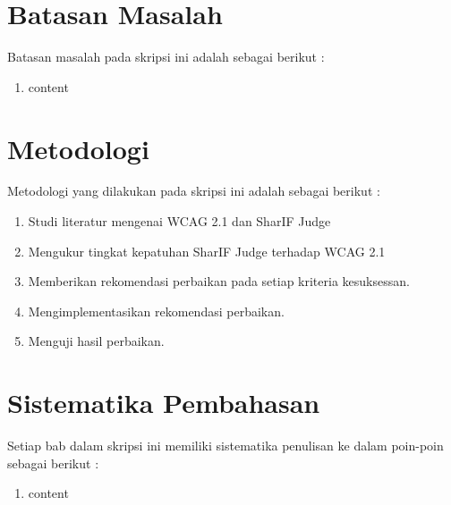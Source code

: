 \section{Batasan Masalah}
\label{sec:batasan}
Batasan masalah pada skripsi ini adalah sebagai berikut :

\begin{enumerate}
	\item content
\end{enumerate}

\section{Metodologi}
\label{sec:metlit}
Metodologi yang dilakukan pada skripsi ini adalah sebagai berikut :

\begin{enumerate}
	\item Studi literatur mengenai WCAG 2.1 dan SharIF Judge
	\item Mengukur tingkat kepatuhan SharIF Judge terhadap WCAG 2.1
	\item Memberikan rekomendasi perbaikan pada setiap kriteria kesuksessan.
	\item Mengimplementasikan rekomendasi perbaikan.
	\item Menguji hasil perbaikan.
\end{enumerate}

\section{Sistematika Pembahasan}
\label{sec:sispem}
Setiap bab dalam skripsi ini memiliki sistematika penulisan ke dalam poin-poin sebagai berikut :

\begin{enumerate}
	\item content
\end{enumerate}